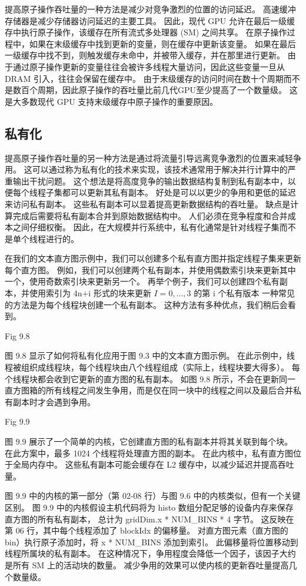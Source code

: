 提高原子操作吞吐量的一种方法是减少对竞争激烈的位置的访问延迟。 高速缓冲存储器是减少存储器访问延迟的主要工具。 
因此，现代 GPU 允许在最后一级缓存中执行原子操作，该缓存在所有流式多处理器 (SM) 之间共享。 
在原子操作过程中，如果在末级缓存中找到更新的变量，则在缓存中更新该变量。 
如果在最后一级缓存中找不到，则触发缓存未命中，并被带入缓存，并在那里进行更新。 
由于通过原子操作更新的变量往往会被许多线程大量访问，因此这些变量一旦从 DRAM 引入，往往会保留在缓存中。 
由于末级缓存的访问时间在数十个周期而不是数百个周期，因此原子操作的吞吐量比前几代GPU至少提高了一个数量级。 
这是大多数现代 GPU 支持末级缓存中原子操作的重要原因。

\subsection{私有化}
提高原子操作吞吐量的另一种方法是通过将流量引导远离竞争激烈的位置来减轻争用。 
这可以通过称为私有化的技术来实现，该技术通常用于解决并行计算中的严重输出干扰问题。 
这个想法是将高度竞争的输出数据结构复制到私有副本中，以便每个线程子集都可以更新其私有副本。 
好处是可以以更少的争用和更低的延迟来访问私有副本。 这些私有副本可以显着提高更新数据结构的吞吐量。 
缺点是计算完成后需要将私有副本合并到原始数据结构中。 人们必须在竞争程度和合并成本之间仔细权衡。 
因此，在大规模并行系统中，私有化通常是针对线程子集而不是单个线程进行的。

在我们的文本直方图示例中，我们可以创建多个私有直方图并指定线程子集来更新每个直方图。 
例如，我们可以创建两个私有副本，并使用偶数索引块来更新其中一个，使用奇数索引块来更新另一个。 
再举个例子，我们可以创建四个私有副本，并使用索引为 4n+i 形式的块来更新 $I = 0,\ldots , 3$ 的第 i 个私有版本
一种常见的方法是为每个线程块创建一个私有副本。 这种方法有多种优点，我们稍后会看到。

{\color{red} Fig 9.8}

图 9.8 显示了如何将私有化应用于图 9.3 中的文本直方图示例。 
在此示例中，线程被组织成线程块，每个线程块由八个线程组成（实际上，线程块要大得多）。 
每个线程块都会收到它更新的直方图的私有副本。 
如图 9.8 所示，不会在更新同一直方图箱的所有线程之间发生争用，而是仅在同一块中的线程之间以及最后合并私有副本时才会遇到争用。

{\color{red} Fig 9.9}

图 9.9 展示了一个简单的内核，它创建直方图的私有副本并将其关联到每个块。 在此方案中，最多 1024 个线程将处理直方图的副本。 
在此内核中，私有直方图位于全局内存中。 这些私有副本可能会缓存在 L2 缓存中，以减少延迟并提高吞吐量。

图 9.9 中的内核的第一部分（第 02-08 行）与图 9.6 中的内核类似，但有一个关键区别。 
图 9.9 中的内核假设主机代码将为 histo 数组分配足够的设备内存来保存直方图的所有私有副本，
总计为 gridDim.x * NUM\_BINS * 4 字节。 这反映在第 06 行，其中每个线程添加了 blockIdx 的偏移量。 
对直方图元素（直方图的 bin）执行原子添加时，将 x * NUM\_BINS 添加到索引。 
此偏移量将位置移动到线程所属块的私有副本。 在这种情况下，争用程度会降低一个因子，该因子大约是所有 SM 上的活动块的数量。 
减少争用的效果可以使内核的更新吞吐量提高几个数量级。

